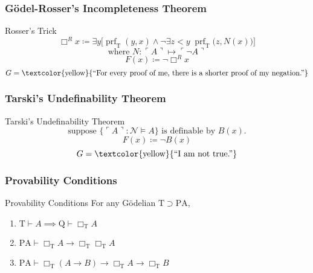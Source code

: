 \documentclass[UTF8,11pt,colorlinks,compress,openany]{beamer}%
\begin{document}
\begin{frame}\frametitle{G\"odel-Rosser's Incompleteness Theorem}
\setlength\abovedisplayskip{0pt}
\setlength\belowdisplayskip{0pt}\vspace{-1ex}
	\begin{block}{Rosser's Trick}
		\[\Box ^R x\coloneqq \exists y\big[\operatorname{prf}_\mathrm{T}(y,x)\wedge\neg\exists z<y\;\operatorname{prf}_\mathrm{T}\big(z,N(x)\big)\big]\]
		\[\text{where } N:\ulcorner A\urcorner\mapsto\ulcorner\neg A\urcorner\]
		\[F(x)\coloneqq \neg\Box ^R x\]
		\[G=\text{\textcolor{yellow}{``For every proof of me, there is a shorter proof of my negation.''}}\]
	\end{block}
\end{frame}

\begin{frame}\frametitle{Tarski's Undefinability Theorem}
	\begin{block}{Tarski's Undefinability Theorem}
		\[\text{suppose $\big\{\ulcorner A\urcorner:\mathcal{N}\vDash A\big\}$ is definable by $B(x)$.}\]
		\[F(x)\coloneqq \neg B(x)\]
		\[G=\text{\textcolor{yellow}{``I am not true.''}}\]
	\end{block}
\end{frame}

\begin{frame}\frametitle{Provability Conditions}
		\begin{block}{Provability Conditions}
			For any G\"odelian $\mathrm{T}\supset \mathrm{PA} $,
			\begin{enumerate}
				\item $\mathrm{T}\vdash A\implies \mathrm{Q}\vdash\Box_\mathrm{T}A$
				\item $\mathrm{PA}\vdash\Box_\mathrm{T}A\to\Box_\mathrm{T}\Box_\mathrm{T}A$
				\item $\mathrm{PA}\vdash\Box_\mathrm{T}(A\to B)\to\Box_\mathrm{T}A\to\Box_\mathrm{T}B$
			\end{enumerate}
		\end{block}
\end{frame}
\end{document}
